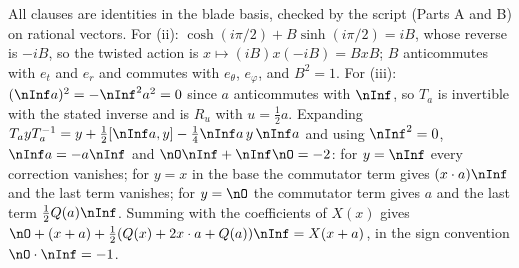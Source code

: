 All clauses are identities in the blade basis, checked by the script (Parts A and B) on rational vectors. For (ii): $\cosh(i\pi/2) + B\sinh(i\pi/2) = iB$, whose reverse is $-iB$, so the twisted action is $x \mapsto (iB)x(-iB) = BxB$; $B$ anticommutes with $e_{t}$ and $e_{r}$ and commutes with $e_{\theta}$, $e_{\varphi}$, and $B^{2} = 1$. For (iii): $(\nInf a)^{2} = -\nInf^{2}a^{2} = 0$ since $a$ anticommutes with $\nInf$, so $T_{a}$ is invertible with the stated inverse and is $R_{u}$ with $u = \tfrac12 a$. Expanding $T_{a}yT_{a}^{-1} = y + \tfrac12[\nInf a, y] - \tfrac14\nInf a\,y\,\nInf a$ and using $\nInf^{2} = 0$, $\nInf a = -a\nInf$ and $\nO\nInf + \nInf\nO = -2$: for $y = \nInf$ every correction vanishes; for $y = x$ in the base the commutator term gives $(x \cdot a)\nInf$ and the last term vanishes; for $y = \nO$ the commutator term gives $a$ and the last term $\tfrac12 Q(a)\nInf$. Summing with the coefficients of $X(x)$ gives $\nO + (x + a) + \tfrac12(Q(x) + 2x\cdot a + Q(a))\nInf = X(x + a)$, in the sign convention $\nO \cdot \nInf = -1$.
